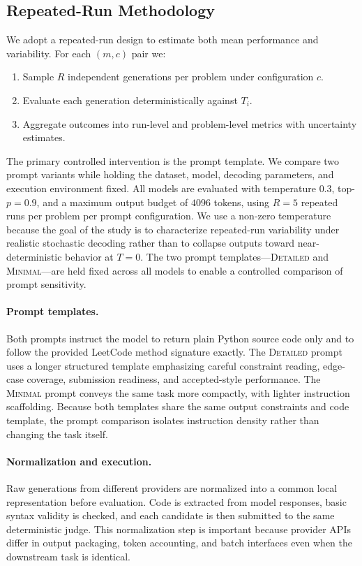 \documentclass[11pt]{article}
\begin{document}
\subsection{Repeated-Run Methodology}
We adopt a repeated-run design to estimate both mean performance and variability. For each $(m,c)$ pair we:
\begin{enumerate}
  \item Sample $R$ independent generations per problem under configuration $c$.
  \item Evaluate each generation deterministically against $T_i$.
  \item Aggregate outcomes into run-level and problem-level metrics with uncertainty estimates.
\end{enumerate}

The primary controlled intervention is the prompt template. We compare two prompt variants while holding the dataset, model, decoding parameters, and execution environment fixed. All models are evaluated with temperature $0.3$, top-$p=0.9$, and a maximum output budget of $4096$ tokens, using $R=5$ repeated runs per problem per prompt configuration. We use a non-zero temperature because the goal of the study is to characterize repeated-run variability under realistic stochastic decoding rather than to collapse outputs toward near-deterministic behavior at $T=0$. The two prompt templates---\textsc{Detailed} and \textsc{Minimal}---are held fixed across all models to enable a controlled comparison of prompt sensitivity.

\paragraph{Prompt templates.} Both prompts instruct the model to return plain Python source code only and to follow the provided LeetCode method signature exactly. The \textsc{Detailed} prompt uses a longer structured template emphasizing careful constraint reading, edge-case coverage, submission readiness, and accepted-style performance. The \textsc{Minimal} prompt conveys the same task more compactly, with lighter instruction scaffolding. Because both templates share the same output constraints and code template, the prompt comparison isolates instruction density rather than changing the task itself.

\paragraph{Normalization and execution.} Raw generations from different providers are normalized into a common local representation before evaluation. Code is extracted from model responses, basic syntax validity is checked, and each candidate is then submitted to the same deterministic judge. This normalization step is important because provider APIs differ in output packaging, token accounting, and batch interfaces even when the downstream task is identical.
\end{document}
